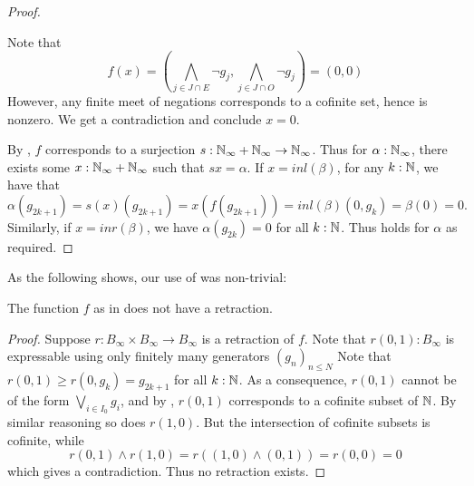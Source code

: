 \begin{proof}
\begin{itemize}
      Note that   
      $$f(x) = (\bigwedge_{j\in J \cap E } \neg g_j , \bigwedge_{j\in J \cap O } \neg g_j ) = (0,0)$$
      However, any finite meet of negations corresponds to a cofinite set, hence is nonzero. 
      We get a contradiction and conclude $x=0$. 
  \end{itemize}
  By ,
  $f$ corresponds to a surjection 
  $s:\mathbb{N}_{\infty} + \mathbb{N}_{\infty} \to \mathbb{N}_{\infty}$.
  Thus for $\alpha : \mathbb{N}_{\infty}$, 
  there exists some $x:\mathbb{N}_{\infty} + \mathbb{N}_{\infty}$ such that $s x = \alpha$. 
  If $x = inl(\beta)$, 
  for any $k:\mathbb{N}$, we have that 
  $$\alpha (g_{2k+1}) = s(x) (g_{2k+1}) = x(f(g_{2k+1})) = inl(\beta) (0,g_k)  = \beta(0) = 0.$$
  Similarly, if $x = inr(\beta)$, we have $\alpha(g_{2k}) = 0$ for all $k:\mathbb{N}$. 
  Thus  holds for $\alpha$ as required. 
\end{proof}
As the following shows, our use of  was non-trivial: 
\begin{lemma}
  The function $f$  as in  does not have a retraction. 
\end{lemma}
\begin{proof}
  Suppose $r:B_\infty \times B_\infty \to B_\infty$ is a retraction of $f$. 
  Note that $r(0,1):B_\infty$ is expressable using only finitely many generators $(g_n)_{n\leq N}$
  Note that $r(0,1) \geq r(0,g_k) = g_{2k+1}$ for all $k:\mathbb{N}$. 
  As a consequence, $r(0,1)$ cannot be of the form $\bigvee_{i\in I_0} g_i$, and by , 
  $r(0,1)$ corresponds to a cofinite subset of $\mathbb{N}$. %
  By similar reasoning so does $r(1,0)$.%
  But the intersection of cofinite subsets is cofinite, while 
  $$r(0,1) \wedge r(1,0) = r( (1,0) \wedge (0,1)) = r(0,0) = 0$$
  which gives a contradiction. Thus no retraction exists. 
\end{proof}

